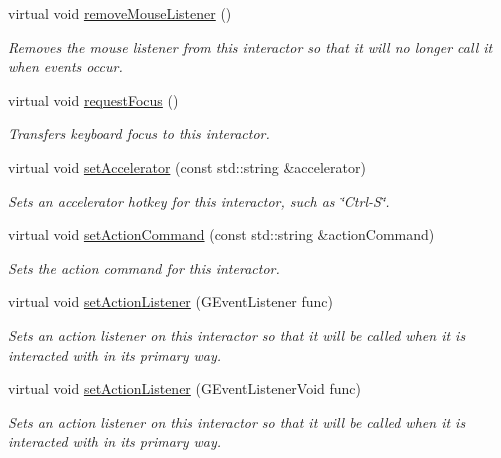 \begin{DoxyCompactItemize}
virtual void \mbox{\hyperlink{classGInteractor_aff47f71ce47e688a07c9d38dc92fcc11}{remove\+Mouse\+Listener}} ()
\begin{DoxyCompactList}\small\item\em Removes the mouse listener from this interactor so that it will no longer call it when events occur. \end{DoxyCompactList}\item 
virtual void \mbox{\hyperlink{classGInteractor_a519fb2ac767f8b2febbb50b898b8c8cb}{request\+Focus}} ()
\begin{DoxyCompactList}\small\item\em Transfers keyboard focus to this interactor. \end{DoxyCompactList}\item 
virtual void \mbox{\hyperlink{classGInteractor_ad15f102f62e2960576012f1aa0ba4b2e}{set\+Accelerator}} (const std\+::string \&accelerator)
\begin{DoxyCompactList}\small\item\em Sets an accelerator hotkey for this interactor, such as \char`\"{}\+Ctrl-\/\+S\char`\"{}. \end{DoxyCompactList}\item 
virtual void \mbox{\hyperlink{classGInteractor_a4b5843fe3030e038a1ba54cc03389bcf}{set\+Action\+Command}} (const std\+::string \&action\+Command)
\begin{DoxyCompactList}\small\item\em Sets the action command for this interactor. \end{DoxyCompactList}\item 
virtual void \mbox{\hyperlink{classGInteractor_adcfb4742430c88714fcf57e57ab8ea9c}{set\+Action\+Listener}} (G\+Event\+Listener func)
\begin{DoxyCompactList}\small\item\em Sets an action listener on this interactor so that it will be called when it is interacted with in its primary way. \end{DoxyCompactList}\item 
virtual void \mbox{\hyperlink{classGInteractor_aebd20a89c7a8a43a6fce999cf4f9fcf2}{set\+Action\+Listener}} (G\+Event\+Listener\+Void func)
\begin{DoxyCompactList}\small\item\em Sets an action listener on this interactor so that it will be called when it is interacted with in its primary way. \end{DoxyCompactList}\item 

\end{DoxyCompactItemize}
